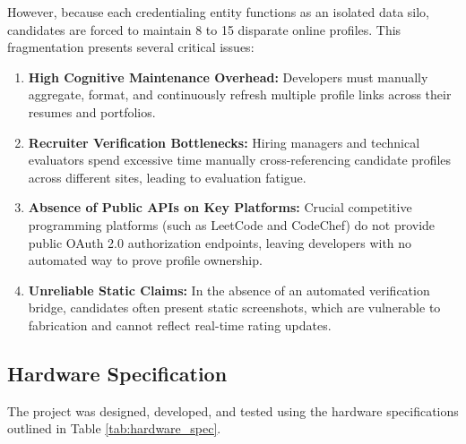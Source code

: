 \documentclass[12pt,a4paper]{article}
\begin{document}
However, because each credentialing entity functions as an isolated data silo, candidates are forced to maintain 8 to 15 disparate online profiles. This fragmentation presents several critical issues:
\begin{enumerate}[leftmargin=*]
    \item \textbf{High Cognitive Maintenance Overhead:} Developers must manually aggregate, format, and continuously refresh multiple profile links across their resumes and portfolios.
    \item \textbf{Recruiter Verification Bottlenecks:} Hiring managers and technical evaluators spend excessive time manually cross-referencing candidate profiles across different sites, leading to evaluation fatigue.
    \item \textbf{Absence of Public APIs on Key Platforms:} Crucial competitive programming platforms (such as LeetCode and CodeChef) do not provide public OAuth 2.0 authorization endpoints, leaving developers with no automated way to prove profile ownership.
    \item \textbf{Unreliable Static Claims:} In the absence of an automated verification bridge, candidates often present static screenshots, which are vulnerable to fabrication and cannot reflect real-time rating updates.
\end{enumerate}

\subsection{Hardware Specification}
The project was designed, developed, and tested using the hardware specifications outlined in Table \ref{tab:hardware_spec}.

\begin{table}[H]
\centering
\caption{Hardware Specifications for Development and Deployment}
\label{tab:hardware_spec}
\end{table}
\end{document}
